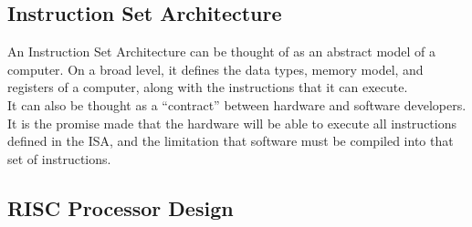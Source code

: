     
\subsection{Instruction Set Architecture}
    An Instruction Set Architecture can be thought of as an abstract model of a computer. On a broad level, it defines the data types, memory model, and registers of a computer, along with the instructions that it can execute. \\
    It can also be thought as a ``contract'' between hardware and software developers. It is the promise made that the hardware will be able to execute all instructions defined in the \gls{ISA}, and the limitation that software must be compiled into that set of instructions.



\subsection{RISC Processor Design}
    
    